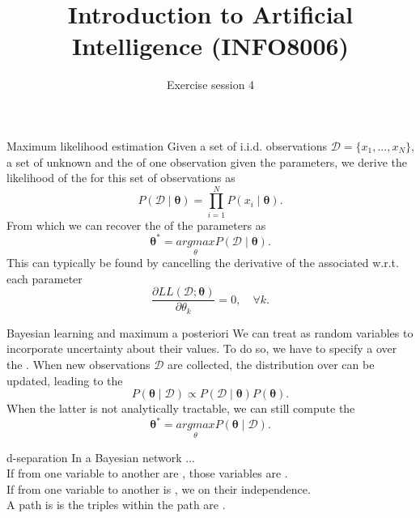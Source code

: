 \documentclass[11pt, a4paper]{article}
\title{Introduction to Artificial Intelligence (INFO8006)}
\subtitle{Exercise session 4}
\begin{document}
\def\var{\text{$\sigma^2$}}

\maketitle

    

\begin{thbox}{Maximum likelihood estimation}
    Given a set of i.i.d. observations $\mathcal{D} = \{x_1,...,x_N\}$, a set of unknown 
    and the  of one observation given the parameters, we derive the likelihood of the  for this set of observations as
    $$
    P(\mathcal{D}\mid \mathbf{\theta}) = \prod_{i=1}^N P(x_i\mid \mathbf{\theta}).
    $$ 
    From which we can recover the  of the parameters as 
    $$
    \mathbf{\theta^*} = \underset{\theta}{argmax}P(\mathcal{D}\mid \mathbf{\theta}).
    $$
    This can typically be found by cancelling the derivative of the associated  w.r.t. each parameter
    $$
    \dfrac{\partial LL(\mathcal{D}; \mathbf{\theta})}{\partial \theta_k} = 0,\quad \forall k.
    $$
\end{thbox}

\begin{thbox}{Bayesian learning and maximum a posteriori}
    We can treat  as random variables to incorporate uncertainty about their values.
    To do so, we have to specify a  over the .
    When new observations $\mathcal{D}$ are collected, the distribution over  can be updated, leading to the 
    $$
    P(\mathbf{\theta}\mid \mathcal{D}) \propto P(\mathcal{D} \mid \mathbf{\theta})P(\mathbf{\theta}).
    $$
    When the latter is not analytically tractable, we can still compute the 
    $$
    \mathbf{\theta^*} = \underset{\theta}{argmax}P(\mathbf{\theta}\mid \mathcal{D}).
    $$
\end{thbox}

\begin{thbox}{d-separation}
In a Bayesian network ...\\

If  from one variable to another are , those variables are .\\

If  from one variable to another is ,  we  on their independence.\\

A path is  is  the triples within the path are .
\end{thbox}
\end{document}
